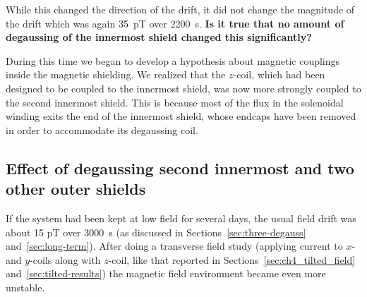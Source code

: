   While this changed the direction of the
drift, it did not change the magnitude of the drift which was again
35~pT over 2200~s.  {\bf Is it true that no amount of degaussing of
  the innermost shield changed this significantly?}

During this time we began to develop a hypothesis about magnetic
couplings inside the magnetic shielding.  We realized that the
$z$-coil, which had been designed to be coupled to the innermost
shield, was now more strongly coupled to the second innermost shield.
This is because most of the flux in the solenoidal winding exits the
end of the innermost shield, whose endcaps have been removed in order
to accommodate its degaussing coil.


\subsection{Effect of degaussing second innermost and two other outer shields}
 
If the system had been kept at low field for several days, the usual
field drift was about 15 pT over 3000~s (as discussed in
Sections~\ref{sec:three-degauss} and~\ref{sec:long-term}).
After doing a transverse field study (applying current to $x$- and
$y$-coils along with $z$-coil, like that reported in
Sections~\ref{sec:ch4_tilted_field} and~\ref{sec:tilted-results}) the
magnetic field environment became even more unstable.

